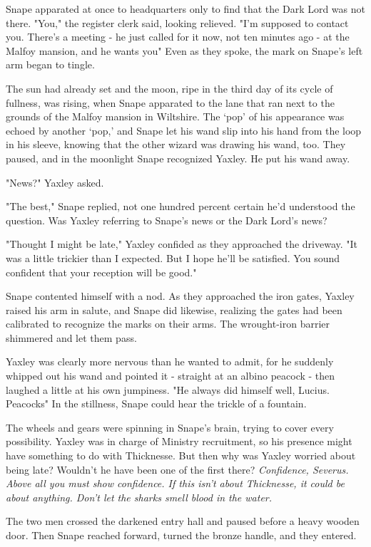 Snape apparated at once to headquarters only to find that the Dark Lord was not there. "You," the register clerk said, looking relieved. "I'm supposed to contact you. There's a meeting - he just called for it now, not ten minutes ago - at the Malfoy mansion, and he wants you{\el}" Even as they spoke, the mark on Snape's left arm began to tingle.

The sun had already set and the moon, ripe in the third day of its cycle of fullness, was rising, when Snape apparated to the lane that ran next to the grounds of the Malfoy mansion in Wiltshire. The `pop' of his appearance was echoed by another `pop,' and Snape let his wand slip into his hand from the loop in his sleeve, knowing that the other wizard was drawing his wand, too. They paused, and in the moonlight Snape recognized Yaxley. He put his wand away.

"News?" Yaxley asked.

"The best," Snape replied, not one hundred percent certain he'd understood the question. Was Yaxley referring to Snape's news or the Dark Lord's news?

"Thought I might be late," Yaxley confided as they approached the driveway. "It was a little trickier than I expected. But I hope he'll be satisfied. You sound confident that your reception will be good."

Snape contented himself with a nod. As they approached the iron gates, Yaxley raised his arm in salute, and Snape did likewise, realizing the gates had been calibrated to recognize the marks on their arms. The wrought-iron barrier shimmered and let them pass.

Yaxley was clearly more nervous than he wanted to admit, for he suddenly whipped out his wand and pointed it - straight at an albino peacock - then laughed a little at his own jumpiness. "He always did himself well, Lucius. Peacocks{\el}" In the stillness, Snape could hear the trickle of a fountain.

The wheels and gears were spinning in Snape's brain, trying to cover every possibility. Yaxley was in charge of Ministry recruitment, so his presence might have something to do with Thicknesse. But then why was Yaxley worried about being late? Wouldn't he have been one of the first there? \emph{Confidence, Severus. Above all you must show confidence. If this isn't about Thicknesse, it could be about anything. Don't let the sharks smell blood in the water.}

The two men crossed the darkened entry hall and paused before a heavy wooden door. Then Snape reached forward, turned the bronze handle, and they entered.

